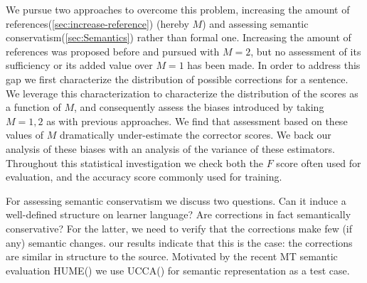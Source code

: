 \documentclass[english]{article}
\begin{document}
We pursue two approaches to overcome this problem, increasing the amount of references(\ref{sec:increase-reference}) (hereby $M$) and assessing semantic conservatism(\ref{sec:Semantics}) rather than formal one. 
Increasing the amount of references was proposed before and pursued with $M=2$, but no assessment of its sufficiency or its added value over $M=1$ has been made. In order to address this gap we first characterize the distribution of possible corrections for a sentence. We leverage this characterization to characterize the distribution of the scores as a function of $M$, and consequently assess the biases introduced by taking $M=1,2$ as with previous approaches. 
We find that assessment based on these values of $M$ dramatically under-estimate the corrector scores. 
We back our analysis of these biases with an analysis of the variance of these estimators.
Throughout this statistical investigation we check both the $F$ score often used for evaluation, and the accuracy score commonly used for training.

For assessing semantic conservatism we discuss two questions. Can it induce a well-defined structure on learner language? Are corrections in fact semantically conservative? For the latter, we need to verify that the corrections make few (if any) semantic changes. our results indicate that this is the case: the corrections are similar in structure to the source. Motivated by the recent MT semantic evaluation HUME(\cite{birch2016hume}) we use UCCA(\cite{abend2013universal}) for semantic representation as a test case.
\end{document}
